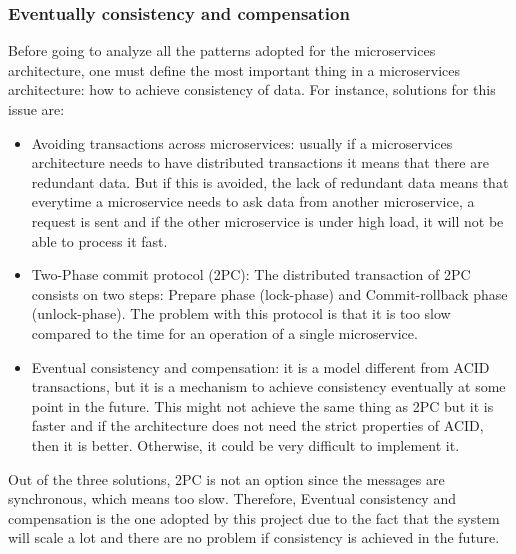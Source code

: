\subsubsection{Eventually consistency and compensation}
Before going to analyze all the patterns adopted for the microservices architecture, one must define the most important thing in a microservices architecture: how to achieve consistency of data. For instance, solutions for this issue are:
\begin{itemize}
\item Avoiding transactions across microservices: usually if a microservices architecture needs to have distributed transactions 
it means that there are redundant data. But if this is avoided, the lack of redundant data means that everytime a microservice needs 
to ask data from another microservice, a request is sent and if the other microservice is under high load, it will not be able to 
process it fast.
\item Two-Phase commit protocol (2PC): The distributed transaction of 2PC consists on two steps: Prepare phase (lock-phase) 
and Commit-rollback phase (unlock-phase). The problem with this protocol is that it is too slow compared to the time for an 
operation of a single microservice.
\item Eventual consistency and compensation: it is a model different from ACID transactions, but it is a mechanism to 
achieve consistency eventually at some point in the future. This might not achieve the same thing as 2PC but it is faster and if 
the architecture does not need the strict properties of ACID, then it is better. Otherwise, it could be very difficult to implement it.
\end{itemize}
Out of the three solutions, 2PC is not an option since the messages are synchronous, which means too slow. Therefore, Eventual consistency and compensation is the one adopted by this project due to the fact that the system will scale a lot and there are no problem if consistency is achieved in the future.


